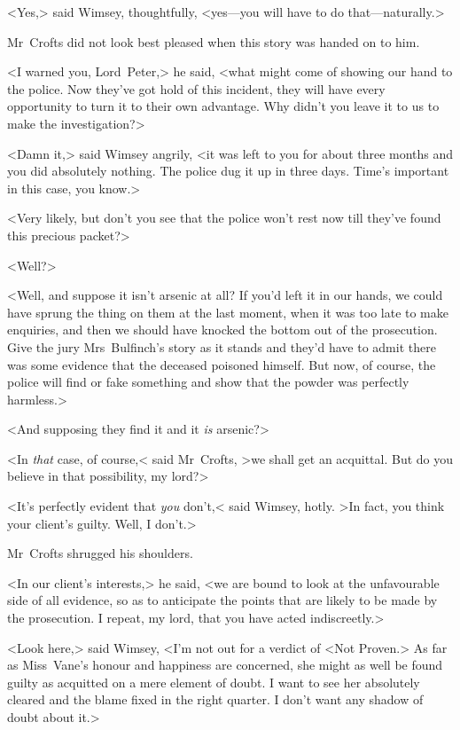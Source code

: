 <Yes,> said Wimsey, thoughtfully, <yes—you will have to do that—naturally.>

\divider

Mr~Crofts did not look best pleased when this story was handed on to him.

<I warned you, Lord~Peter,> he said, <what might come of showing our hand to the police. Now they've got hold of this incident, they will have every opportunity to turn it to their own advantage. Why didn't you leave it to us to make the investigation?>

<Damn it,> said Wimsey angrily, <it was left to you for about three months and you did absolutely nothing. The police dug it up in three days. Time's important in this case, you know.>

<Very likely, but don't you see that the police won't rest now till they've found this precious packet?>

<Well?>

<Well, and suppose it isn't arsenic at all? If you'd left it in our hands, we could have sprung the thing on them at the last moment, when it was too late to make enquiries, and then we should have knocked the bottom out of the prosecution. Give the jury Mrs~Bulfinch's story as it stands and they'd have to admit there was some evidence that the deceased poisoned himself. But now, of course, the police will find or fake something and show that the powder was perfectly harmless.>

<And supposing they find it and it \emph{is} arsenic?>

<In \emph{that} case, of course,< said Mr~Crofts, >we shall get an acquittal. But do you believe in that possibility, my lord?>

<It's perfectly evident that \emph{you} don't,< said Wimsey, hotly. >In fact, you think your client's guilty. Well, I don't.>

Mr~Crofts shrugged his shoulders.

<In our client's interests,> he said, <we are bound to look at the unfavourable side of all evidence, so as to anticipate the points that are likely to be made by the prosecution. I repeat, my lord, that you have acted indiscreetly.>

<Look here,> said Wimsey, <I'm not out for a verdict of <Not Proven.> As far as Miss~Vane's honour and happiness are concerned, she might as well be found guilty as acquitted on a mere element of doubt. I want to see her absolutely cleared and the blame fixed in the right quarter. I don't want any shadow of doubt about it.>

